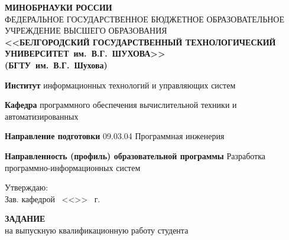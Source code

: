\documentclass[14pt]{extarticle}
\begin{document}
\begin{center}
	\small
	\textbf{МИНОБРНАУКИ РОССИИ} \\[0.5em]
	ФЕДЕРАЛЬНОЕ ГОСУДАРСТВЕННОЕ БЮДЖЕТНОЕ ОБРАЗОВАТЕЛЬНОЕ УЧРЕЖДЕНИЕ 
	ВЫСШЕГО ОБРАЗОВАНИЯ \\[0.3em]
	\textbf{<<БЕЛГОРОДСКИЙ ГОСУДАРСТВЕННЫЙ ТЕХНОЛОГИЧЕСКИЙ\\УНИВЕРСИТЕТ~им.~В.Г.~ШУХОВА>>}\\
	\textbf{(БГТУ~им.~В.Г.~Шухова)}
\end{center}%
\begin{list}{}{\setlength{\leftmargin}{0cm}\setlength{\parsep}{1pt}}
	\small\sloppy
	\item\textbf{Институт} информационных технологий и управляющих систем
	\item\textbf{Кафедра} программного обеспечения вычислительной техники и автоматизированных 
	\item\textbf{Направление подготовки} 09.03.04 Программная инженерия
	\item\textbf{Направленность (профиль) образовательной программы} Разработка программно-информационных систем
\end{list}
\vspace{-0.5cm}
{\small\noindent
\hspace*{8.0cm}Утверждаю:\\
\hspace*{8cm}Зав. кафедрой \hrulefill \,
\hspace*{8.0cm}<<\underline{\hspace{1cm}}>> \underline{\hspace{3cm}} \the\year \ г.
}
\begin{center}
	\small
	\textbf{ЗАДАНИЕ} \\
	на выпускную квалификационную работу студента \\[0.3em]
	\noindent
	\underline{}
\end{center}
\vspace{1em}
\end{document}
